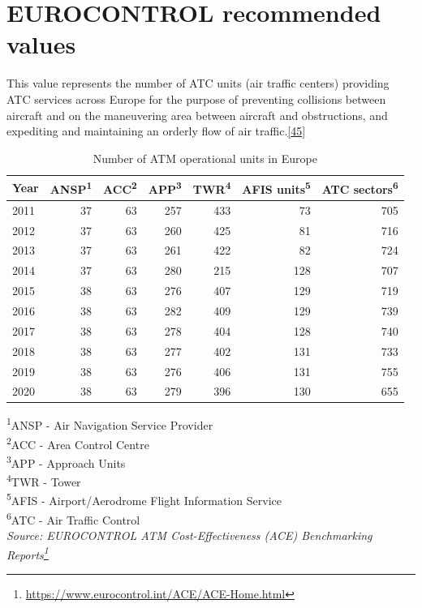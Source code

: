 \documentclass[
  11pt,
  a4paper,
]{book}
\DeclareRobustCommand{\href}[2]{#2\footnote{\url{#1}}}
\begin{document}
\hypertarget{eurocontrol-recommended-values-29}{%
\section{EUROCONTROL recommended
values}\label{eurocontrol-recommended-values-29}}

This value represents the number of ATC units (air traffic centers)
providing ATC services across Europe for the purpose of preventing
collisions between aircraft and on the maneuvering area between aircraft
and obstructions, and expediting and maintaining an orderly flow of air
traffic.\protect\hyperlink{ref-ace2020}{{[}45{]}}

\hypertarget{tbl-atm-op-units}{}
\setlength{\LTpost}{0mm}
\begin{longtable}{lrrrrrr}
\caption{\label{tbl-atm-op-units}Number of ATM operational units in Europe }\tabularnewline

\toprule
Year & ANSP\textsuperscript{1} & ACC\textsuperscript{2} & APP\textsuperscript{3} & TWR\textsuperscript{4} & AFIS units\textsuperscript{5} & ATC sectors\textsuperscript{6} \\ 
\midrule
2011 & 37 & 63 & 257 & 433 & 73 & 705 \\ 
2012 & 37 & 63 & 260 & 425 & 81 & 716 \\ 
2013 & 37 & 63 & 261 & 422 & 82 & 724 \\ 
2014 & 37 & 63 & 280 & 215 & 128 & 707 \\ 
2015 & 38 & 63 & 276 & 407 & 129 & 719 \\ 
2016 & 38 & 63 & 282 & 409 & 129 & 739 \\ 
2017 & 38 & 63 & 278 & 404 & 128 & 740 \\ 
2018 & 38 & 63 & 277 & 402 & 131 & 733 \\ 
2019 & 38 & 63 & 276 & 406 & 131 & 755 \\ 
2020 & 38 & 63 & 279 & 396 & 130 & 655 \\ 
\bottomrule
\end{longtable}
\begin{minipage}{\linewidth}
\textsuperscript{1}ANSP - Air Navigation Service Provider\\
\textsuperscript{2}ACC - Area Control Centre\\
\textsuperscript{3}APP - Approach Units\\
\textsuperscript{4}TWR - Tower\\
\textsuperscript{5}AFIS - Airport/Aerodrome Flight Information Service\\
\textsuperscript{6}ATC - Air Traffic Control\\
\emph{Source: \href{https://www.eurocontrol.int/ACE/ACE-Home.html}{EUROCONTROL ATM Cost-Effectiveness (ACE) Benchmarking Reports}}\\
\end{minipage}
\end{document}
